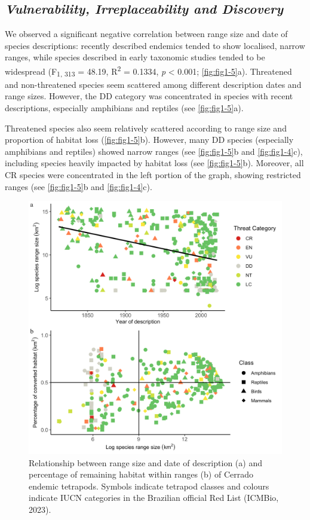 \documentclass[12pt,openright,oneside,a4paper,english]{abntex2}
\begin{document}
\subsection{\textit{Vulnerability, Irreplaceability and Discovery}}

We observed a significant negative correlation between range size and date of species descriptions: recently described endemics tended to show localised, narrow ranges, while species described in early taxonomic studies tended to be widespread (F\textsubscript{1, 313} = 48.19, R\textsuperscript{2} = 0.1334,  \textit{p} < 0.001; \autoref{fig:fig1-5}a). Threatened and non-threatened species seem scattered among different description dates and range sizes. However, the DD category was concentrated in species with recent descriptions, especially amphibians and reptiles (see \autoref{fig:fig1-5}a).

Threatened species also seem relatively scattered according to range size and proportion of habitat loss (\autoref{fig:fig1-5}b). However, many DD species (especially amphibians and reptiles) showed narrow ranges (see \autoref{fig:fig1-5}b and \autoref{fig:fig1-4}c), including species heavily impacted by habitat loss (see \autoref{fig:fig1-5}b). Moreover, all CR species were concentrated in the left portion of the graph, showing restricted ranges (see \autoref{fig:fig1-5}b and \autoref{fig:fig1-4}c).

\begin{figure}[H]
	\centering
	\includegraphics[width=160mm]{Fig c1-5}
	\caption[Range-size, description date and habitat loss]{\small Relationship between range size and date of description (a) and percentage of remaining habitat within ranges (b) of Cerrado endemic tetrapods. Symbols indicate tetrapod classes and colours indicate IUCN categories in the Brazilian official Red List (ICMBio, 2023).}
	\label{fig:fig1-5}
\end{figure}
\end{document}
